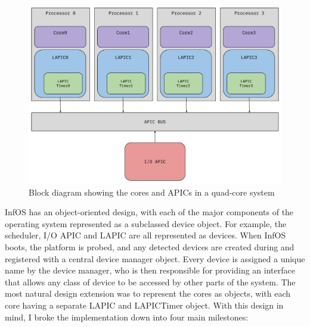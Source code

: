 \documentclass[bsc,frontabs,singlespacing,parskip,deptreport]{infthesis}
\begin{document}
\begin{figure}[h]
    \centering
    \includegraphics[scale=0.6]{figures/cores-lapics.pdf}
    \caption{Block diagram showing the cores and APICs in a quad-core system}
    \label{cores-lapics}
\end{figure}


InfOS has an object-oriented design, with each of the major components of the operating system represented as a subclassed device object. For example, the scheduler, I/O APIC and LAPIC are all represented as devices. When InfOS boots, the platform is probed, and any detected devices are created during and registered with a central device manager object. Every device is assigned a unique name by the device manager, who is then responsible for providing an interface that allows any class of device to be accessed by other parts of the system. The most natural design extension was to represent the cores as objects, with each core having a separate LAPIC and LAPICTimer object. With this design in mind, I broke the implementation down into four main milestones:
\end{document}
